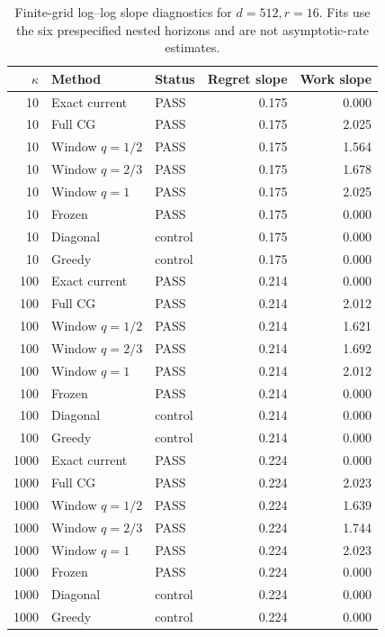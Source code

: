 \begin{table}[p]
\centering\scriptsize
\begin{tabular}{rllrr}
\toprule
$\kappa$ & Method & Status & Regret slope & Work slope \\
\midrule
10 & Exact current & PASS & 0.175 & 0.000 \\
10 & Full CG & PASS & 0.175 & 2.025 \\
10 & Window $q=1/2$ & PASS & 0.175 & 1.564 \\
10 & Window $q=2/3$ & PASS & 0.175 & 1.678 \\
10 & Window $q=1$ & PASS & 0.175 & 2.025 \\
10 & Frozen & PASS & 0.175 & 0.000 \\
10 & Diagonal & control & 0.175 & 0.000 \\
10 & Greedy & control & 0.175 & 0.000 \\
100 & Exact current & PASS & 0.214 & 0.000 \\
100 & Full CG & PASS & 0.214 & 2.012 \\
100 & Window $q=1/2$ & PASS & 0.214 & 1.621 \\
100 & Window $q=2/3$ & PASS & 0.214 & 1.692 \\
100 & Window $q=1$ & PASS & 0.214 & 2.012 \\
100 & Frozen & PASS & 0.214 & 0.000 \\
100 & Diagonal & control & 0.214 & 0.000 \\
100 & Greedy & control & 0.214 & 0.000 \\
1000 & Exact current & PASS & 0.224 & 0.000 \\
1000 & Full CG & PASS & 0.224 & 2.023 \\
1000 & Window $q=1/2$ & PASS & 0.224 & 1.639 \\
1000 & Window $q=2/3$ & PASS & 0.224 & 1.744 \\
1000 & Window $q=1$ & PASS & 0.224 & 2.023 \\
1000 & Frozen & PASS & 0.224 & 0.000 \\
1000 & Diagonal & control & 0.224 & 0.000 \\
1000 & Greedy & control & 0.224 & 0.000 \\
\bottomrule
\end{tabular}
\caption{Finite-grid log--log slope diagnostics for $d=512,r=16$.  Fits use the six prespecified nested horizons and are not asymptotic-rate estimates.}
\label{tab:certified-scaling-fits-6}
\end{table}

